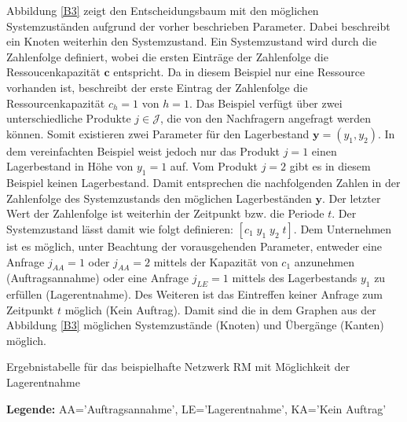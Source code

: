 Abbildung \ref{B3} zeigt den Entscheidungsbaum mit den möglichen Systemzuständen aufgrund der vorher beschrieben Parameter. Dabei beschreibt ein Knoten weiterhin den Systemzustand. Ein Systemzustand wird durch die Zahlenfolge definiert, wobei die ersten Einträge der Zahlenfolge die Ressoucenkapazität $\textbf{c}$ entspricht. Da in diesem Beispiel nur eine Ressource vorhanden ist, beschreibt der erste Eintrag der Zahlenfolge die Ressourcenkapazität $c_{h}=1$ von $h=1$. Das Beispiel verfügt über zwei unterschiedliche Produkte $j\in\mathcal{J}$, die von den Nachfragern angefragt werden können. Somit existieren zwei Parameter für den Lagerbestand $\textbf{y}=(y_{1},y_{2})$. In dem vereinfachten Beispiel weist jedoch nur das Produkt $j=1$ einen Lagerbestand in Höhe von $y_{1}=1$ auf. Vom Produkt $j=2$ gibt es in diesem Beispiel keinen Lagerbestand. Damit entsprechen die nachfolgenden Zahlen in der Zahlenfolge des Systemzustands den möglichen Lagerbeständen $\textbf{y}$. Der letzter Wert der Zahlenfolge ist weiterhin der Zeitpunkt bzw. die Periode $t$. Der Systemzustand lässt damit wie folgt definieren: $[c_{1}\; y_{1}\; y_{2}\;t]$. Dem Unternehmen ist es möglich, unter Beachtung der vorausgehenden Parameter, entweder eine Anfrage $j_{AA}=1$ oder $j_{AA}=2$ mittels der Kapazität von $c_{1}$ anzunehmen (Auftragsannahme) oder eine Anfrage $j_{LE}=1$ mittels des Lagerbestands $y_{1}$ zu erfüllen (Lagerentnahme). Des Weiteren ist das Eintreffen keiner Anfrage zum Zeitpunkt $t$ möglich (Kein Auftrag). Damit sind die in dem Graphen aus der Abbildung \ref{B3} möglichen Systemzustände (Knoten) und Übergänge (Kanten) möglich.

\begin{table}
\begin{footnotesize}
    \caption{Ergebnistabelle für das beispielhafte Netzwerk RM mit Möglichkeit der Lagerentnahme} \label{Tab3}
    \vspace*{3mm}
    \begin{center}
      \end{center}
    \begin{center}
      {\footnotesize \textbf{Legende:} AA='Auftragsannahme', LE='Lagerentnahme', KA='Kein Auftrag'} 
      \end{center}
\end{footnotesize}
\end{table}

